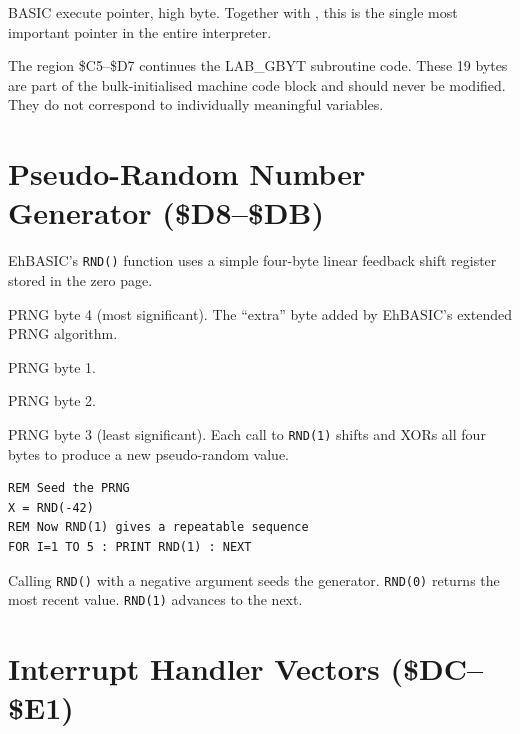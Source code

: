 
BASIC execute pointer, high byte.  Together with , this is the
single most important pointer in the entire interpreter.

\begin{notebox}
The region \$C5--\$D7 continues the LAB\_GBYT subroutine code.  These 19
bytes are part of the bulk-initialised machine code block and should never be
modified.  They do not correspond to individually meaningful variables.
\end{notebox}

\section{Pseudo-Random Number Generator (\$D8--\$DB)}

EhBASIC's \texttt{RND()} function uses a simple four-byte linear feedback
shift register stored in the zero page.


PRNG byte 4 (most significant).  The ``extra'' byte added by EhBASIC's
extended PRNG algorithm.


PRNG byte 1.


PRNG byte 2.


PRNG byte 3 (least significant).  Each call to \texttt{RND(1)} shifts and
XORs all four bytes to produce a new pseudo-random value.

\begin{lstlisting}
REM Seed the PRNG
X = RND(-42)
REM Now RND(1) gives a repeatable sequence
FOR I=1 TO 5 : PRINT RND(1) : NEXT
\end{lstlisting}

Calling \texttt{RND()} with a negative argument seeds the generator.
\texttt{RND(0)} returns the most recent value.  \texttt{RND(1)} advances
to the next.

\section{Interrupt Handler Vectors (\$DC--\$E1)}

